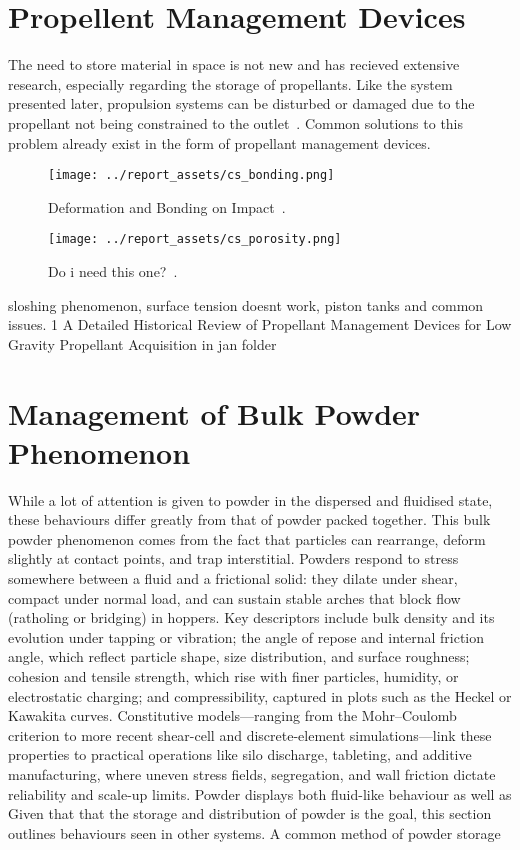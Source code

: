 \section{Propellent Management Devices}
The need to store material in space is not new and has recieved extensive research, especially regarding the storage of propellants. Like the system presented later, propulsion systems can be disturbed or damaged due to the propellant not being constrained to the outlet~\cite{Hartwig2016}. Common solutions to this problem already exist in the form of propellant management devices.  
\begin{figure}[htbp]
    \centering
    
    \begin{minipage}{0.45\textwidth}
        \centering
        \texttt{[image: ../report\_assets/cs\_bonding.png]}
        \caption*{Deformation and Bonding on Impact~\cite{ZHANG2024137157}.}
    \end{minipage}
    \hfill
    \begin{minipage}{0.45\textwidth}
        \centering
        \texttt{[image: ../report\_assets/cs\_porosity.png]}
        \caption*{Do i need this one?~\cite{coatings13040738}.}
    \end{minipage}
    
\end{figure}\label{fig:pmd}
sloshing phenomenon, surface tension doesnt work, piston tanks and common issues.
1
A Detailed Historical Review of Propellant Management
Devices for Low Gravity Propellant Acquisition
in jan folder
\section{Management of Bulk Powder Phenomenon}
While a lot of attention is given to powder in the dispersed and fluidised state, these behaviours differ greatly from that of powder packed together. This bulk powder phenomenon comes from the fact that particles can rearrange, deform slightly at contact points, and trap interstitial. Powders respond to stress somewhere between a fluid and a frictional solid: they dilate under shear, compact under normal load, and can sustain stable arches that block flow (ratholing or bridging) in hoppers. Key descriptors include bulk density and its evolution under tapping or vibration; the angle of repose and internal friction angle, which reflect particle shape, size distribution, and surface roughness; cohesion and tensile strength, which rise with finer particles, humidity, or electrostatic charging; and compressibility, captured in plots such as the Heckel or Kawakita curves. Constitutive models—ranging from the Mohr–Coulomb criterion to more recent shear-cell and discrete-element simulations—link these properties to practical operations like silo discharge, tableting, and additive manufacturing, where uneven stress fields, segregation, and wall friction dictate reliability and scale-up limits.
Powder displays both fluid-like behaviour as well as 
Given that that the storage and distribution of powder is the goal, this section outlines behaviours seen in other systems. A common method of powder storage
\newpage
